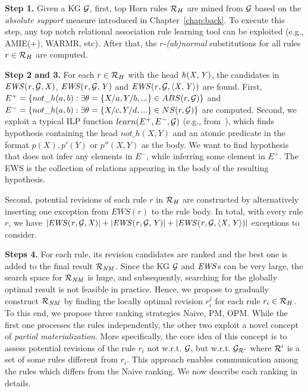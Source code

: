 \noindent \textbf{Step 1.} Given a KG $\mathcal{G}$, first, top Horn rules $\mathcal{R}_H$ are mined from $\mathcal{G}$ based on the \textit{absolute support} measure introduced in Chapter~\ref{chap:back}. To execute this step, any top notch relational association rule learning tool can be exploited (e.g., AMIE(+), WARMR, etc). After that, the $r$-\emph{(ab)normal} substitutions for all rules $r\in \mathcal{R}_H$ are computed.
\smallskip


\noindent \textbf{Step 2 and 3.} For each $r \in \mathcal{R}_H$ with the head $\mathit{h(X,Y)}$, the candidates in $\mathit{EWS(r,\mathcal{G},X)}$, $\mathit{EWS(r,\mathcal{G},Y)}$ and $\mathit{EWS(r,\mathcal{G},\langle X,Y\rangle)}$ are found. First, $E^+ = \{not\_h(a, b): \exists \theta = \{X/a, Y/b, ... \} \in ABS(r, \mathcal{G})\}$ and $E^- = \{not\_h(a, b): \exists \theta = \{X/c, Y/d, ... \} \in NS(r, \mathcal{G})\}$ are computed. Second, we exploit a typical ILP function $learn(E^+, E^-, \mathcal{G})$ (e.g., from~\cite{ref55}), which finds hypothesis containing the head $not\_h(X, Y)$ and an atomic predicate in the format $p(X), p'(Y)$ or $p''(X, Y)$ as the body. We want to find hypothesis that does not infer any elements in $E^-$, while inferring some element in $E^+$. The EWS is the collection of relations appearing in the body of the resulting hypothesis.

Second, potential revisions of each rule $r$ in $\mathcal{R}_H$ are constructed by alternatively inserting one exception from $EWS(r)$ to the rule body. In total, with every rule $r$, we have $|\mathit{EWS(r,\mathcal{G},X)}|+|\mathit{EWS(r,\mathcal{G},Y)}|+|\mathit{EWS(r,\mathcal{G},\langle X,Y\rangle)}|$ exceptions to consider.

\smallskip

\noindent \textbf{Steps 4.} For each rule, its revision candidates are ranked and the best one is added to the final result $\mathcal{R}_{\mathit{NM}}$. Since the KG $\mathcal{G}$ and $\mathit{EWS}$s can be very large, the search space for $\mathcal{R}_{\mathit{NM}}$ is huge, and subsequently, searching for the globally optimal result is not feasible in practice. Hence, we propose to gradually construct $\mathcal{R}_{\mathit{NM}}$ by finding the locally optimal revision $r_i^{j}$ for each rule $r_i \in \mathcal{R}_{H}$. To this end, we propose three ranking strategies Naive, PM, OPM. While the first one processes the rules independently, the other two exploit a novel concept of \emph{partial materialization}. More specifically, the core idea of this concept is to assess potential revisions of the rule $r_i$ not w.r.t. $\mathcal{G}$, but w.r.t. $\mathcal{G}_{\mathcal{R}'}$ where $\mathcal{R}'$ is a set of some rules different from $r_i$. This approach enables communication among the rules which differs from the Naive ranking. We now describe each ranking in details.

